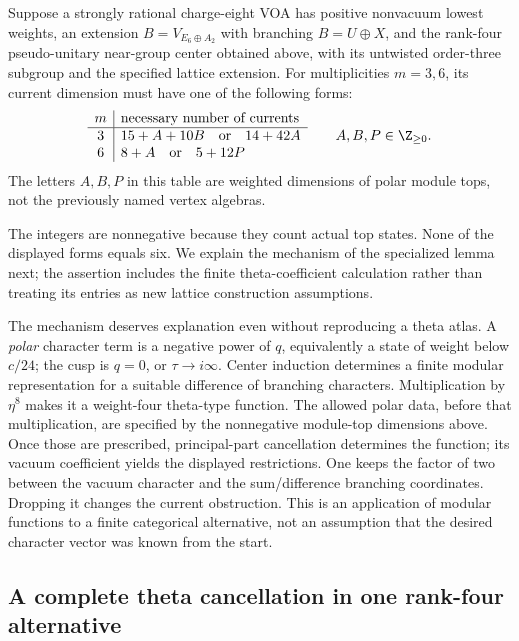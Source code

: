 \begin{lemma}\label{lem:c-rank4-character}
Suppose a strongly rational charge-eight VOA has positive nonvacuum
lowest weights, an extension $B=V_{E_6\oplus A_2}$ with branching
$B=U\oplus X$, and the rank-four pseudo-unitary near-group center
obtained above, with its untwisted order-three subgroup and the
specified lattice extension. For multiplicities $m=3,6$, its current
dimension must have one of the following forms:
\[
\begin{array}{c|l}
 m&\text{necessary number of currents}\\\hline
 3&15+A+10B\quad\text{or}\quad14+42A\\
 6&8+A\quad\text{or}\quad5+12P
\end{array}
\qquad A,B,P\in\Z_{\geq0}.
\]
The letters $A,B,P$ in this table are weighted dimensions of polar
module tops, not the previously named vertex algebras.
\end{lemma}

The integers are nonnegative because they count actual top states.
None of the displayed forms equals six. We explain the mechanism of
the specialized lemma next; the assertion includes the finite
theta-coefficient calculation rather than treating its entries as
new lattice construction assumptions.

The mechanism deserves explanation even without reproducing a theta
atlas. A \emph{polar} character term is a negative power of $q$,
equivalently a state of weight below $c/24$; the cusp is $q=0$,
or $\tau\to i\infty$. Center induction determines a finite modular
representation
for a suitable difference of branching characters. Multiplication by
$\eta^8$ makes it a weight-four theta-type function. The allowed polar
data, before that multiplication, are specified by the nonnegative
module-top dimensions above. Once those are prescribed, principal-part cancellation determines the
function; its vacuum coefficient yields the displayed restrictions.
One keeps the factor of two between the vacuum character and the
sum/difference branching coordinates. Dropping it changes the current
obstruction. This is an application of modular functions to a finite
categorical alternative, not an assumption that the desired character
vector was known from the start.

\subsection{A complete theta cancellation in one rank-four alternative}

